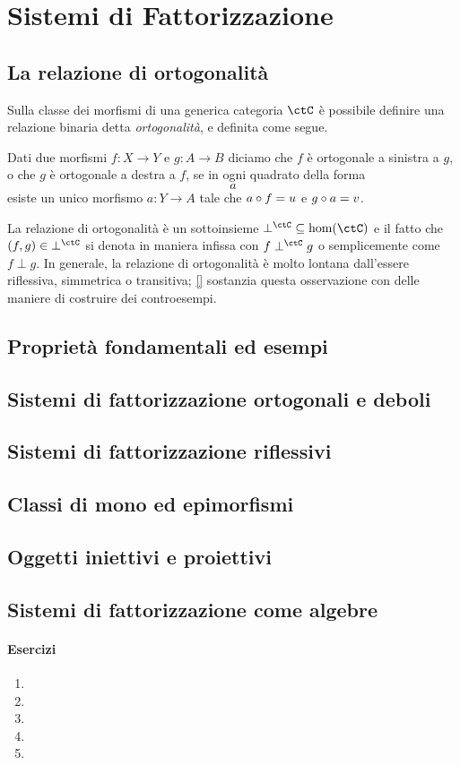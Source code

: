 \chapter{Sistemi di Fattorizzazione}
\section[Ortogonalità]{La relazione di ortogonalità}
Sulla classe dei morfismi di una generica categoria $\ctC$ è possibile definire una relazione binaria detta \emph{ortogonalità}, e definita come segue.
\begin{definition}
    Dati due morfismi $f : X\to Y$ e $g : A\to B$ diciamo che $f$ è ortogonale a sinistra a $g$, o che $g$ è ortogonale a destra a $f$, se in ogni quadrato della forma 
    \[a\]
    esiste un unico morfismo $a : Y\to A$ tale che $a\circ f=u$ e $g\circ a=v$.
\end{definition}
La relazione di ortogonalità è un sottoinsieme $\mathbin{\perp^\ctC} \subseteq \hom(\ctC)$ e il fatto che $(f,g)\in \mathbin{\perp^\ctC}$ si denota in maniera infissa con $f\perp^\ctC g$ o semplicemente come $f\perp g$. In generale, la relazione di ortogonalità è molto lontana dall'essere riflessiva, simmetrica o transitiva; \autoref{} sostanzia questa osservazione con delle maniere di costruire dei controesempi.
\section[Proprietà ed esempi]{Proprietà fondamentali ed esempi}
\section[Fattorizzazione]{Sistemi di fattorizzazione ortogonali e deboli}
\section[Riflessività]{Sistemi di fattorizzazione riflessivi}
\section[Mono ed epimorfismi]{Classi di mono ed epimorfismi}
\section[Iniettivi e proiettivi]{Oggetti iniettivi e proiettivi}
\section[Fattorizzazione e algebre]{Sistemi di fattorizzazione come algebre}
\subsubsection*{Esercizi}
\begin{enumerate}
    \item 
    \item 
    \item 
    \item 
    \item 
\end{enumerate}